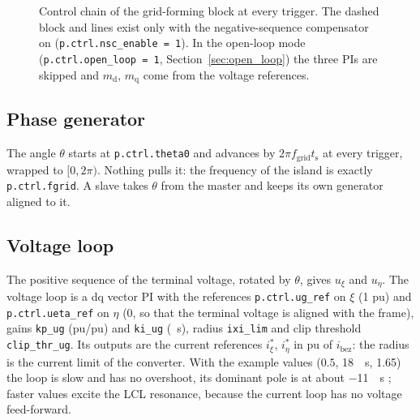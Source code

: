 \documentclass[11pt,a4paper]{scrartcl}
\newcommand{\ped}[1]{_{\mathrm{#1}}}
\newcommand{\code}[1]{\texttt{#1}}
\begin{document}
\begin{onehalfspace}
\begin{figure}[htbp]
{}
	\captionsetup{width=0.9\textwidth, font=small}
	\caption[Control chain of the grid-forming block.]{Control chain of the grid-forming block at every trigger. The dashed block and lines exist only with the negative-sequence compensator on (\code{p.ctrl.nsc\_enable = 1}). In the open-loop mode (\code{p.ctrl.open\_loop = 1}, Section~\ref{sec:open_loop}) the three PIs are skipped and $m\ped{d}$, $m\ped{q}$ come from the voltage references.}
	\label{fig:gfm_chain}
\end{figure}

\subsection{Phase generator}
\label{sec:phase_gen}

The angle $\theta$ starts at \code{p.ctrl.theta0} and advances by $2\pi f\ped{grid} t\ped{s}$ at every trigger, wrapped to $[0, 2\pi)$. Nothing pulls it: the frequency of the island is exactly \code{p.ctrl.fgrid}. A slave takes $\theta$ from the master and keeps its own generator aligned to it.

\subsection{Voltage loop}
\label{sec:voltage_loop}

The positive sequence of the terminal voltage, rotated by $\theta$, gives $u_\xi$ and $u_\eta$. The voltage loop is a dq vector PI with the references \code{p.ctrl.ug\_ref} on $\xi$ (1 pu) and \code{p.ctrl.ueta\_ref} on $\eta$ (0, so that the terminal voltage is aligned with the frame), gains \code{kp\_ug} (pu/pu) and \code{ki\_ug} (\si{\per\second}), radius \code{ixi\_lim} and clip threshold \code{clip\_thr\_ug}. Its outputs are the current references $i^{*}_\xi$, $i^{*}_\eta$ in pu of $i\ped{bez}$: the radius is the current limit of the converter. With the example values ($0.5$, \SI{18}{\per\second}, \SI{1.65}{\pu}) the loop is slow and has no overshoot, its dominant pole is at about \SI{-11}{\per\second} \cite{gfm_note}; faster values excite the LCL resonance, because the current loop has no voltage feed-forward.


\end{onehalfspace}
\end{document}
